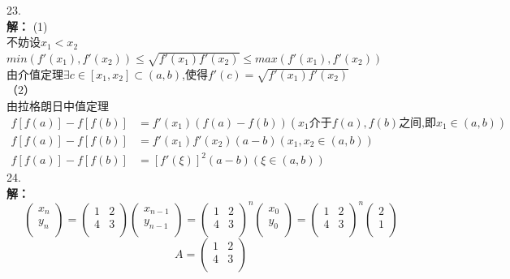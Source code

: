 \documentclass[a4paper]{article}
\begin{document}
23.\\
\textbf{解：}
(1)\\
不妨设$x_1<x_2$\\
$min(f'(x_1),f'(x_2))\le \sqrt{f'(x_1)f'(x_2)} \le max(f'(x_1),f'(x_2))$\\
由介值定理$\exists c\in\left[x_1,x_2\right]\subset (a,b)$,使得$f'(c)=\sqrt{f'(x_1)f'(x_2)}$\\
（2）\\
由拉格朗日中值定理
\begin{align*}
    f\left[f(a)\right]-f\left[f(b)\right]&=f'(x_1) (f(a)-f(b)) \left(x_1\text{介于}f(a),f(b)\text{之间,即}x_1\in(a,b)\right)\\
    f\left[f(a)\right]-f\left[f(b)\right]&=f'(x_1)f'(x_2)(a-b)\left(x_1,x_2 \in (a,b)\right)\\
    f\left[f(a)\right]-f\left[f(b)\right]&=\left[f'(\xi)\right]^2(a-b)\left(\xi \in (a,b)\right)
\end{align*}
24.\\
\textbf{解：}
$$\begin{pmatrix}
    x_n\\
    y_n\\
\end{pmatrix}=\begin{pmatrix}
    1&2\\
    4&3\\
\end{pmatrix}\begin{pmatrix}
    x_{n-1}\\
    y_{n-1}\\
\end{pmatrix}=\begin{pmatrix}
    1&2\\
    4&3\\
\end{pmatrix}^n\begin{pmatrix}
    x_{0}\\
    y_{0}\\
\end{pmatrix}=\begin{pmatrix}
    1&2\\
    4&3\\
\end{pmatrix}^n\begin{pmatrix}
    2\\
    1\\
\end{pmatrix}$$
$$A=\begin{pmatrix}
    1&2\\
    4&3\\
\end{pmatrix}$$
\end{document}

